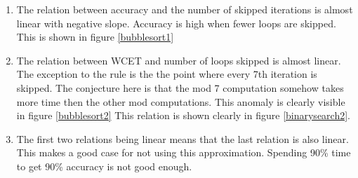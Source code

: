 \begin{enumerate}
\item The relation between accuracy and the number of skipped iterations is almost linear with negative slope. Accuracy is high when fewer loops are skipped. This is shown in figure \ref{bubblesort1} 
\item The relation between WCET and number of loops skipped is almost linear. The exception to the rule is the the point where every 7th iteration is skipped. The conjecture here is that the mod 7 computation somehow takes more time then the other mod computations. This anomaly is clearly visible in figure \ref{bubblesort2}  This relation is shown clearly in figure \ref{binarysearch2}.
  \item The first two relations being linear means that the last relation is also linear. This makes a good case for not using this approximation. Spending 90\% time to get 90\% accuracy is not good enough.
\end{enumerate}





